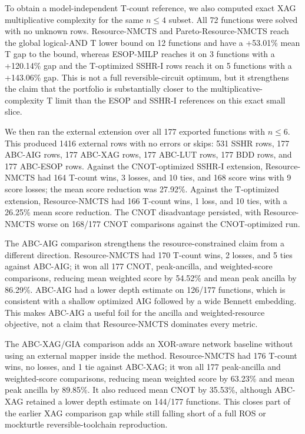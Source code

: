 \documentclass[11pt]{article}
\newcommand{\method}{Resource-NMCTS}
\newcommand{\paretomethod}{Pareto-Resource-NMCTS}
\begin{document}
\begin{table}[t]
\centering
\small
\caption{Exact XAG multiplicative-complexity lower-bound comparison on the
same 72-function $n\leq 4$ subset.  The exact search minimizes the number of
AND nodes in an XOR-AND graph; $4\times$AND is a global lower bound on
logical-AND T-count, but not a CNOT or depth optimum.}
\label{tab:exact-xag-mc}

\end{table}

To obtain a model-independent T-count reference, we also computed exact XAG
multiplicative complexity for the same $n\leq 4$ subset.  All 72 functions were
solved with no unknown rows.  \method{} and \paretomethod{} reach the global
logical-AND T lower bound on 12 functions and have a +53.01\% mean T gap to the
bound, whereas ESOP-MILP reaches it on 3 functions with a +120.14\% gap and the
T-optimized SSHR-I rows reach it on 5 functions with a +143.06\% gap.  This is
not a full reversible-circuit optimum, but it strengthens the claim that the
portfolio is substantially closer to the multiplicative-complexity T limit than
the ESOP and SSHR-I references on this exact small slice.

We then ran the external extension over all 177 exported functions with
$n\leq 6$.  This produced 1416 external rows with no errors or skips: 531 SSHR
rows, 177 ABC-AIG rows, 177 ABC-XAG rows, 177 ABC-LUT rows, 177 BDD rows, and
177 ABC-ESOP rows.
Against the CNOT-optimized SSHR-I extension, \method{} had 164 T-count wins, 3
losses, and 10 ties, and 168 score wins with
9 score losses; the mean score reduction was 27.92\%.  Against the T-optimized
extension, \method{} had 166 T-count wins, 1 loss, and 10 ties, with a 26.25\%
mean score reduction.  The CNOT disadvantage persisted, with \method{} worse on
168/177 CNOT comparisons against the CNOT-optimized run.

The ABC-AIG comparison strengthens the resource-constrained claim from a
different direction.  \method{} had 170 T-count wins, 2 losses, and 5 ties
against ABC-AIG; it won all 177 CNOT, peak-ancilla, and weighted-score
comparisons, reducing mean weighted score by 54.52\% and mean peak ancilla by
86.29\%.  ABC-AIG had a lower depth estimate on 126/177 functions, which is
consistent with a shallow optimized AIG followed by a wide Bennett embedding.
This makes ABC-AIG a useful foil for the ancilla and weighted-resource
objective, not a claim that \method{} dominates every metric.

The ABC-XAG/GIA comparison adds an XOR-aware network baseline without using an
external mapper inside the method.  \method{} had 176 T-count wins, no losses,
and 1 tie against ABC-XAG; it won all 177 peak-ancilla and weighted-score
comparisons, reducing mean weighted score by 63.23\% and mean peak ancilla by
89.85\%.  It also reduced mean CNOT by 35.53\%, although ABC-XAG retained a
lower depth estimate on 144/177 functions.  This closes part of the earlier
XAG comparison gap while still falling short of a full ROS or mockturtle
reversible-toolchain reproduction.
\end{document}
